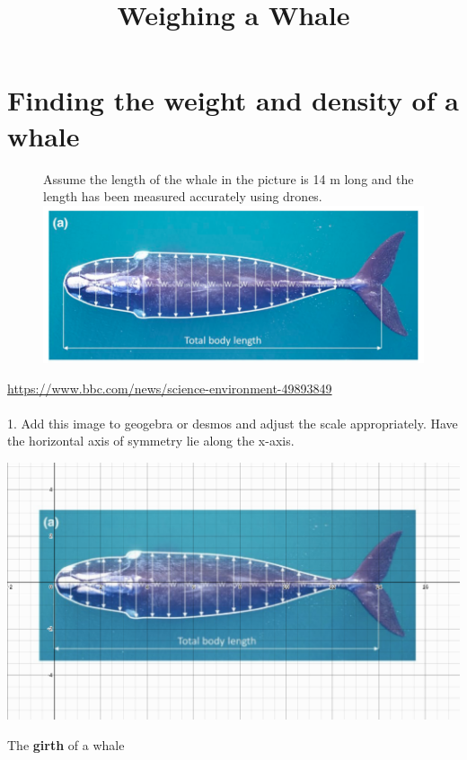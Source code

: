 \documentclass{article}
\title{\Huge Weighing a Whale}
\date{}
\begin{document}
\maketitle

\section{Finding the weight and density of a whale}

\begin{figure}
  Assume the length of the whale in the picture is 14 m long and the length has been measured accurately using drones.
  \includegraphics{whale_with_distances.png}
\end{figure}

\href{https://www.bbc.com/news/science-environment-49893849}{https://www.bbc.com/news/science-environment-49893849}
\\\\

1. Add this image to geogebra or desmos and adjust the scale appropriately. Have the horizontal axis of symmetry lie along the x-axis.

\includegraphics[scale=0.3]{desmos-whale.png}

The \textbf{girth} of a whale 
\end{document}
